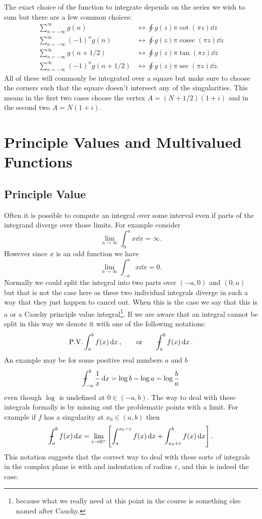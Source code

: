 \documentclass{article}
\DeclareMathOperator{\cosec}{cosec}
\newcommand{\pvint}{{-\mkern-19mu}\int}
\begin{document}
    The exact choice of the function to integrate depends on the series we wish to sum but there are a few common choices:
    \begin{align*}
        \sum_{n=-\infty}^{\infty} g(n) &\longleftrightarrow \oint g(z) \pi \cot(\pi z) \dd{z}\\
        \sum_{n=-\infty}^{\infty} (-1)^n g(n) &\longleftrightarrow \oint g(z) \pi \cosec(\pi z) \dd{z}\\
        \sum_{n=-\infty}^{\infty} g(n + 1/2) &\longleftrightarrow \oint g(z) \pi \tan(\pi z) \dd{z}\\
        \sum_{n=-\infty}^{\infty} (-1)^ng(n + 1/2) &\longleftrightarrow \oint g(z) \pi \sec(\pi z) \dd{z}.
    \end{align*}
    All of these will commonly be integrated over a square but make sure to choose the corners such that the square doesn't intersect any of the singularities.
    This means in the first two cases choose the vertex \(A = (N + 1/2)(1 + i)\) and in the second two \(A = N(1 + i)\).
    
    \section{Principle Values and Multivalued Functions}
    \subsection{Principle Value}
    Often it is possible to compute an integral over some interval even if parts of the integrand diverge over those limits.
    For example consider
    \[\lim_{a\to\infty} \int_{0}^{a} x \dd{x} = \infty.\]
    However since \(x\) is an odd function we have
    \[\lim_{a\to\infty} \int_{-a}^{a} x \dd{x} = 0.\]
    Normally we could split the integral into two parts over \((-a, 0)\) and \((0, a)\) but that is not the case here as these two individual integrals diverge in such a way that they just happen to cancel out.
    When this is the case we say that this is a  or a Cauchy principle value integral\footnote{because what we really need at this point in the course is something else named after Cauchy.}.
    If we are aware that an integral cannot be split in this way we denote it with one of the following notations:
    \[\mathrm{P.V.} \int_{a}^{b} f(x)\dd{x}, \qquad\text{or}\qquad \pvint_{a}^{b} f(x) \dd{x}.\]
    An example may be for some positive real numbers \(a\) and \(b\)
    \[\pvint_{-a}^{b} \frac{1}{x}\dd{x} = \log b - \log a = \log\frac{b}{a}\]
    even though \(\log\) is undefined at \(0 \in (-a, b)\).
    The way to deal with these integrals formally is by missing out the problematic points with a limit.
    For example if \(f\) has a singularity at \(x_0 \in (a, b)\) then
    \[\pvint_{a}^{b} f(x) \dd{x} = \lim_{\varepsilon\to 0^+} \left[ \int_{a}^{x_0 - \varepsilon} f(x) \dd{x} + \int_{x_0 + \varepsilon}^{b} f(x) \dd{x} \right].\]
    This notation suggests that the correct way to deal with these sorts of integrals in the complex plane is with and indentation of radius \(\varepsilon\), and this is indeed the case.
    
\end{document}
